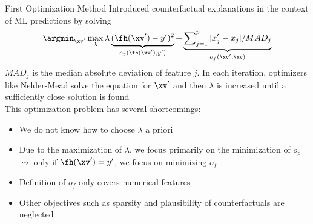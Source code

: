 \documentclass[11pt,compress,t,notes=noshow, aspectratio=169, xcolor=table]{beamer}
\begin{document}
\begin{frame}{First Optimization Method }
Introduced counterfactual explanations in the context of ML predictions by solving
		\begin{equation}
			\argmin_{\xv'} \max_{\lambda} \lambda \underbrace{(\fh(\xv') - y')^2}_{o_p(\fh(\xv'), y')} + \underbrace{\sum\nolimits_{j = 1}^p |x'_j - x_j|/MAD_j}_{o_f(\xv', \xv)}
		\end{equation}
	$MAD_j$ is the median absolute deviation of feature $j$. In each iteration, optimizers like Nelder-Mead solve the equation for $\xv'$ and then $\lambda$ is increased until a sufficiently close solution is found \\[0.2cm]
	
	
	This optimization problem has several shortcomings: 	
	\begin{itemize}%
		\item We do not know how to choose $\lambda$ a priori 
		\item Due to the maximization of $\lambda$, we focus primarily on the minimization of $o_p$\\
		$\leadsto$ only if $\fh(\xv') = y'$, we focus on minimizing $o_f$ 
		\item Definition of $o_f$ only covers numerical features 
		\item Other objectives such as sparsity and plausibility of counterfactuals are neglected
	\end{itemize}
	


\end{frame}
\end{document}
